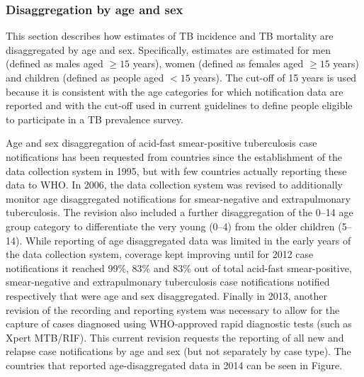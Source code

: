 \subsubsection{Disaggregation by age and sex}

This section describes how estimates of TB incidence and TB mortality are disaggregated by age and sex. Specifically, estimates are estimated for men (defined as males aged $\geq 15$ years), women (defined as females aged $\geq 15$ years) and children (defined as people aged $< 15$ years). The cut-off of 15 years is used because it is consistent with the age categories for which notification data are reported and with the cut-off used in current guidelines to define people eligible to participate in a TB prevalence survey\cite{WHO2011}.

Age and sex disaggregation of acid-fast smear-positive tuberculosis case notifications has been requested from countries since the establishment of the data collection system in 1995, but with few countries actually reporting these data to WHO. In 2006, the data collection system was revised to additionally monitor age disaggregated notifications for smear-negative and extrapulmonary tuberculosis. The revision also included a further disaggregation of the 0–14 age group category to differentiate the very young (0–4) from the older children (5–14). While reporting of age disaggregated data was limited in the early years of the data collection system, coverage kept improving until for 2012 case notifications it reached 99\%, 83\% and 83\% out of total acid-fast smear-positive, smear-negative and extrapulmonary tuberculosis case notifications notified respectively that were age and sex disaggregated. Finally in 2013, another revision of the recording and reporting system was necessary to allow for the capture of cases diagnosed using WHO-approved rapid diagnostic tests (such as Xpert MTB/RIF). This current revision requests the reporting of all new and relapse case notifications by age and sex (but not separately by case type). The countries that reported age-disaggregated data in 2014 can be seen in Figure. 